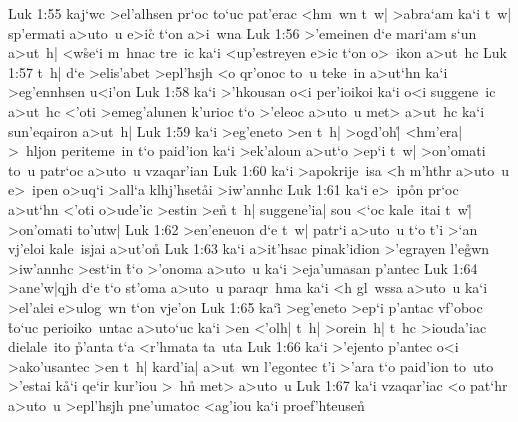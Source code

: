 \vs Luk 1:55
kaj`wc
>el'alhsen
pr`oc
to`uc
pat'erac
<hm~wn
t~w|
>abra`am
ka`i
t~w|
sp'ermati
a>uto~u
e>ic\r{}
t`on
a>i~wna\bibvsend
\vs Luk 1:56
>'emeinen
d`e
mari`am
s`un
a>ut~h|
<w\r{s}e`i
m~hnac
tre~ic
ka`i
<up'estreyen
e>ic
t`on
o>~ikon
a>ut~hc\bibvsend
\vs Luk 1:57
t~h|
d`e
>elis'abet
>epl'hsjh
<o
qr'onoc
to~u
teke~in
a>ut`hn
ka`i
>eg'ennhsen
u<i'on\bibvsend
\vs Luk 1:58
ka`i
>'hkousan
o<i
per'ioikoi
ka`i
o<i
suggene~ic
a>ut~hc
<'oti
>emeg'alunen
k'urioc
t`o
>'eleoc
a>uto~u
met>
a>ut~hc
ka`i
sun'eqairon
a>ut~h|\bibvsend
\vs Luk 1:59
ka`i
>eg'eneto
>en
t~h|
>ogd'oh|\r{}
<hm'era|
>~hljon
periteme~in
t`o
paid'ion
ka`i
>ek'aloun
a>ut`o
>ep`i
t~w|
>on'omati
to~u
patr`oc
a>uto~u
vzaqar'ian\bibvsend
\vs Luk 1:60
ka`i
>apokrije~isa
<h
m'hthr
a>uto~u
e>~ipen
o>uq`i
>all`a
klhj'hset\r{a}i
>iw'annhc\bibvsend
\vs Luk 1:61
ka`i
e>~ip\r{o}n
pr`oc
a>ut`hn
<'oti
o>ude'ic
>estin
>en\r{}
t~h|
suggene'ia|
sou
<`oc
kale~itai
t~w|\r{}
>on'omati
to'utw|\bibvsend
\vs Luk 1:62
>en'eneuon
d`e
t~w|
patr`i
a>uto~u
t`o
t'i
>`an
vj'eloi
kale~isjai
a>ut'o\r{n}\bibvsend
{}
\vs Luk 1:63
ka`i
a>it'hsac
pinak'idion
>'egrayen
l'e\r{g}wn
>iw'annhc
>est`in
\r{t}`o
>'onoma
a>uto~u
ka`i
>eja'umasan
p'antec\bibvsend
\vs Luk 1:64
>ane'w|qjh
d`e
t`o
st'oma
a>uto~u
paraqr~hma
ka`i
<h
gl~wssa
a>uto~u
ka`i
>el'alei
e>ulog~wn
t`on
vje'on\bibvsend
\vs Luk 1:65
ka`i\r{}
>eg'eneto
>ep`i
p'antac
vf'oboc
\r{t}o`uc
perioiko~untac
a>uto`uc
ka`i
>en
<'olh|
t~h|
>orein~h|
t~hc
>iouda'iac
dielale~ito
\r{p}'anta
t`a
<r'hmata
ta~uta\bibvsend
\vs Luk 1:66
ka`i
>'ejento
p'antec
o<i
>ako'usantec
>en
t~h|
kard'ia|
a>ut~wn
l'egontec
t'i
>'ara
t`o
paid'ion
to~uto
>'estai
k\r{a}`i
qe`ir
kur'iou
>~h\r{n}
met>
a>uto~u\bibvsend
\vs Luk 1:67
ka`i
vzaqar'iac
<o
pat`hr
a>uto~u
>epl'hsjh
pne'umatoc
<ag'iou
ka`i
proef'hteusen\r{}
